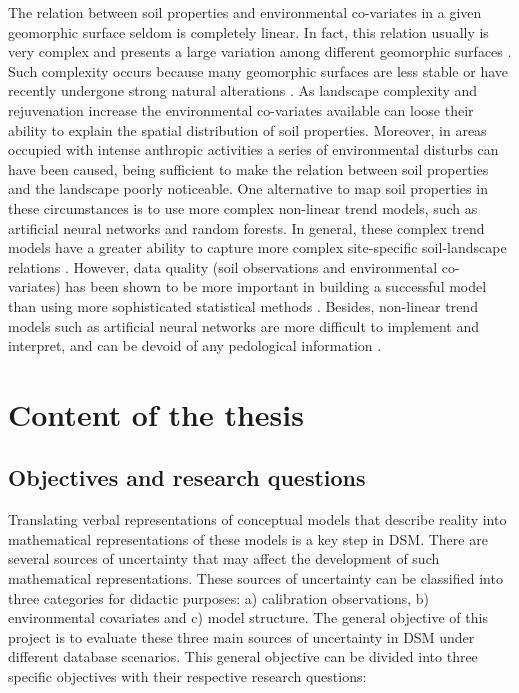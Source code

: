 The relation between soil properties and environmental co-variates
in a given geomorphic surface seldom is completely linear. In fact,
this relation usually is very complex and presents a large variation
among different geomorphic surfaces \cite{McKenzieEtAl2000}. Such
complexity occurs because many geomorphic surfaces are less stable
or have recently undergone strong natural alterations \cite{Schumm1979}.
As landscape complexity and rejuvenation increase the environmental
co-variates available can loose their ability to explain the spatial
distribution of soil properties. Moreover, in areas occupied with
intense anthropic activities a series of environmental disturbs can
have been caused, being sufficient to make the relation between soil
properties and the landscape poorly noticeable. One alternative to
map soil properties in these circumstances is to use more complex
non-linear trend models, such as artificial neural networks and random
forests. In general, these complex trend models have a greater ability
to capture more complex site-specific soil-landscape relations \cite{Grunwald2009}.
However, data quality (soil observations and environmental co-variates)
has been shown to be more important in building a successful model
than using more sophisticated statistical methods \cite{ParkEtAl2002, 
MinasnyEtAl2007}.
Besides, non-linear trend models such as artificial neural networks
are more difficult to implement and interpret, and can be devoid of
any pedological information \cite{Grunwald2009}.

\section{Content of the thesis}

\subsection{Objectives and research questions}



Translating verbal representations of conceptual models that describe reality 
into mathematical representations of these models is a key step in DSM. There 
are several sources of uncertainty that may affect the development of such 
mathematical representations. These sources of uncertainty can be classified 
into three categories for didactic purposes: a) calibration observations, b) 
environmental covariates and c) model structure. The general objective of this 
project is to evaluate these three main sources of uncertainty in DSM under 
different database scenarios. This general objective can be divided into three 
specific objectives with their respective research questions:

